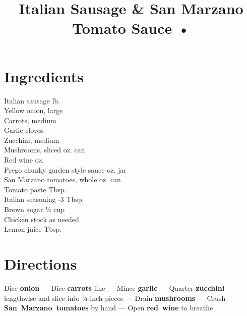 \documentclass[11pt,letterpaper]{article}
\title{Italian Sausage \& San Marzano Tomato Sauce •}
\author{}
\date{}
\begin{document}
\maketitle
\thispagestyle{empty}

\section*{Ingredients}
\setlength{\columnsep}{20pt}
\begin{multicols}{2}
\noindent
    Italian sausage  lb. \\
    Yellow onion, large  \\
    Carrots, medium  \\
    Garlic cloves  \\
    Zucchini, medium  \\
    Mushrooms, sliced  oz. can \\
    Red wine  oz. \\
    \columnbreak
    Prego chunky garden style sauce  oz. jar \\
    San Marzano tomatoes, whole  oz. can \\
    Tomato paste  Tbsp. \\
    Italian seasoning -3 Tbsp. \\
    Brown sugar \dotfill ¼ cup \\
    Chicken stock \dotfill as needed \\
    Lemon juice  Tbsp. \\
\end{multicols}

\section*{Directions}

\noindent
Dice \textbf{onion} ---
Dice \textbf{carrots} fine ---
Mince \textbf{garlic} ---
Quarter \textbf{zucchini} lengthwise and slice into ¼-inch pieces ---
Drain \textbf{mushrooms} ---
Crush \textbf{San~Marzano~tomatoes} by hand ---
Open \textbf{red~wine} to breathe
\end{document}

